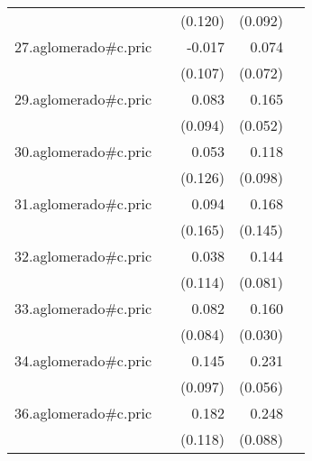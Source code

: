 {\begin{longtable}{l*{4}{D{.}{.}{-1}}}
            &                     &     (0.120)         &     (0.092)         &                     \\
\addlinespace
27.aglomerado#c.pric&                     &      -0.017         &       0.074         &                     \\
            &                     &     (0.107)         &     (0.072)         &                     \\
\addlinespace
29.aglomerado#c.pric&                     &       0.083         &       0.165\sym{**} &                     \\
            &                     &     (0.094)         &     (0.052)         &                     \\
\addlinespace
30.aglomerado#c.pric&                     &       0.053         &       0.118         &                     \\
            &                     &     (0.126)         &     (0.098)         &                     \\
\addlinespace
31.aglomerado#c.pric&                     &       0.094         &       0.168         &                     \\
            &                     &     (0.165)         &     (0.145)         &                     \\
\addlinespace
32.aglomerado#c.pric&                     &       0.038         &       0.144         &                     \\
            &                     &     (0.114)         &     (0.081)         &                     \\
\addlinespace
33.aglomerado#c.pric&                     &       0.082         &       0.160\sym{***}&                     \\
            &                     &     (0.084)         &     (0.030)         &                     \\
\addlinespace
34.aglomerado#c.pric&                     &       0.145         &       0.231\sym{***}&                     \\
            &                     &     (0.097)         &     (0.056)         &                     \\
\addlinespace
36.aglomerado#c.pric&                     &       0.182         &       0.248\sym{**} &                     \\
            &                     &     (0.118)         &     (0.088)         &                     \\

\end{longtable}}
